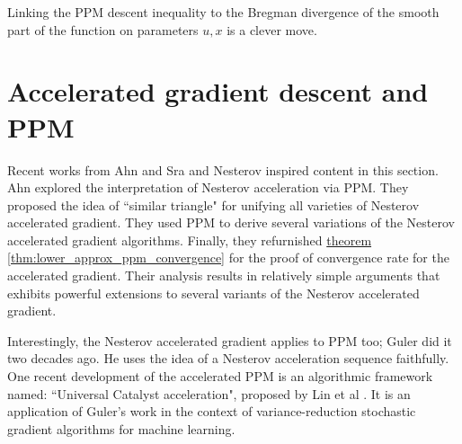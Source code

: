 \documentclass[12pt]{article}
\begin{document}
        \begin{remark}
            Linking the PPM descent inequality to the Bregman divergence of the smooth part of the function on parameters $u, x$ is a clever move. 
        \end{remark}

        
\section{Accelerated gradient descent and PPM}
    Recent works from Ahn and Sra \cite{ahn_understanding_2022} and Nesterov \cite{nesterov_lectures_2018} inspired content in this section.
    Ahn explored the interpretation of Nesterov acceleration via PPM. 
    They proposed the idea of ``similar triangle" for unifying all varieties of Nesterov accelerated gradient. 
    They used PPM to derive several variations of the Nesterov accelerated gradient algorithms. 
    Finally, they refurnished \hyperref[thm:lower_approx_ppm_convergence]{theorem \ref*{thm:lower_approx_ppm_convergence}} for the proof of convergence rate for the accelerated gradient.
    Their analysis results in relatively simple arguments that exhibits powerful extensions to several variants of the Nesterov accelerated gradient. 
    
    \par\noindent
    Interestingly, the Nesterov accelerated gradient applies to PPM too; Guler \cite{guler_new_1992} did it two decades ago. 
    He uses the idea of a Nesterov acceleration sequence faithfully. 
    One recent development of the accelerated PPM is an algorithmic framework named: ``Universal Catalyst acceleration", proposed by Lin et al \cite{lin_universal_2015}. 
    It is an application of Guler's work in the context of variance-reduction stochastic gradient algorithms for machine learning. 
    
\end{document}
